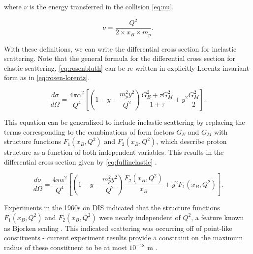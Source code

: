         where $\nu$ is the energy transferred in the collision \eqref{eq:nu}. 
        
        \begin{equation}\label{eq:nu}
            \nu = \frac{Q^2}{2\times x_B\times m_p}.
        \end{equation}
        

        With these definitions, we can write the differential cross section for inelastic scattering. Note that the general formula for the differential cross section for elastic scattering, \eqref{eq:rosenbluth} can be re-written in explicitly Lorentz-invariant form as in \eqref{eq:rosen-lorentz}.

        \begin{equation}\label{eq:rosen-lorentz}
            \frac{d\sigma}{d\Omega} = \frac{4\pi\alpha^2}{Q^4} \left[ \left( 1 -y -\frac{m_p^2 y^2}{Q^2}       \right) \frac{G_E^2+\tau G_M^2}{1+\tau} +y^2 \frac{G_M^2}{2} \right].
        \end{equation}

        This equation can be generalized to include inelastic scattering by replacing the terms corresponding to the combinations of form factors $G_E$ and $G_M$ with structure functions $F_1(x_B,Q^2)$ and $F_2(x_B,Q^2)$, which describe proton structure as a function of both independent variables. This results in the differential cross section given by \eqref{eq:fullinelastic} .

        \begin{equation}\label{eq:fullinelastic}
            \frac{d\sigma}{d\Omega} = \frac{4\pi\alpha^2}{Q^4} \left[ \left( 1 -y -\frac{m_p^2 y^2}{Q^2}       \right) \frac{F_2(x_B,Q^2)}{x_B} +y^2 F_1(x_B,Q^2) \right].
        \end{equation}


        
        Experiments in the 1960s on DIS indicated that the structure functions $F_1(x_B,Q^2)$ and $F_2(x_B,Q^2)$ were nearly independent of $Q^2$, a feature known as Bjorken scaling \parencite{Bjorken1969InelasticNucleon}. This indicated scattering was occurring off of point-like constituents - current experiment results provide a constraint on the maximum radius of these constituent to be at most $10^{-18}$ m \parencite{Thomson2013ModernPhysics}. 


